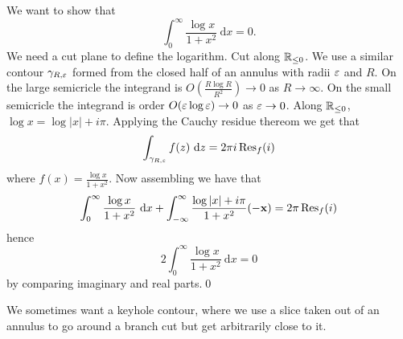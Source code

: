 \documentclass{article}
\begin{document}
\begin{example}
  We want to show that
  \[
	  \int_0^\infty \frac{\log x}{1+x^2} \ \mathrm dx =0.
  \]
  We need a cut plane to define the logarithm. Cut along $ \mathbb{R}_{\le 0} $. We use a similar contour $ \gamma_{R,\varepsilon} $ formed from the closed half of an annulus with radii $ \varepsilon $ and $ R $. On the large semicricle the integrand is $ O\left(\frac{R\log R}{R^2}\right)\to 0 $ as $ R\to\infty $. On the small semicricle the integrand is order $ O(\varepsilon\log\varepsilon)\to 0 $ as $ \varepsilon \to 0 $. Along $ \mathbb{R}_{\le 0} $, $ \log x = \log|x| + i\pi $. Applying the Cauchy residue thereom we get that
  \[
	  \int_{\gamma_{R,\ep}} f(z) \ \mathrm dz = 2\pi i \Res_f(i) 
  \]
  where $ f(x) = \frac{\log x}{1+x^2} $. Now assembling we have that
  \[
	  \int_0^\infty \frac{\log x}{1+x^2} \ \mathrm dx + \int_{-\infty}^\infty \frac{\log|x| + i \pi}{1+x^2}(-\mathbf x) = 2\pi \Res_f(i)
  \]
  hence
  \[
	  2\int_0^\infty \frac{\log x}{1+x^2} \ \mathrm dx = 0
  \]
  by comparing imaginary and real parts.\qed
\end{example}
\begin{remark}
  We sometimes want a keyhole contour, where we use a slice taken out of an annulus to go around a branch cut but get arbitrarily close to it.
\end{remark}
\end{document}
